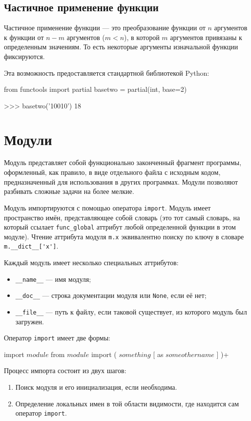 \subsection{Частичное применение функции}
Частичное применение функции --- это преобразование функции от $n$ аргументов к функции от $n - m$ аргументов ($m < n$), в которой $m$ аргументов привязаны к определенным значениям. То есть некоторые аргументы изначальной функции фиксируются.

Эта возможность предоставляется стандартной библиотекой Python:
\begin{pylst}{}{}
from functools import partial
basetwo = partial(int, base=2)

>>> basetwo('10010')
18
\end{pylst}

\section{Модули}
\label{sec:py-modules}
Модуль представляет собой функционально законченный фрагмент программы, оформленный, как правило, в виде отдельного файла с исходным кодом, предназначенный для использования в других программах. Модули позволяют разбивать сложные задачи на более мелкие.

Модуль импортируются с помощью оператора \lstinline{import}. Модуль имеет пространство имён, представляющее собой словарь (это тот самый словарь, на который ссылает \lstinline{func_global} аттрибут любой определенной функции в этом модуле). Чтение аттрибута модуля \lstinline{m.x} эквивалентно поиску по ключу в словаре \lstinline{m.__dict__['x']}.

Каждый модуль имеет несколько специальных аттрибутов:
\begin{itemize}
  \item \lstinline{__name__} --- имя модуля;
  \item \lstinline{__doc__} --- строка документации модуля или \lstinline{None}, если её нет;
  \item \lstinline{__file__} --- путь к файлу, если таковой существует, из которого модуль был загружен.
\end{itemize}

Оператор \lstinline{import} имеет две формы:
\begin{pylst}{}{}
import $module$
from $module$ import ( $something$ [ as $someothername$ ] )+
\end{pylst}

Процесс импорта состоит из двух шагов:
\begin{enumerate}
  \item Поиск модуля и его инициализация, если необходима.
  \item Определение локальных имен в той области видимости, где находится сам оператор \lstinline{import}.
\end{enumerate}

